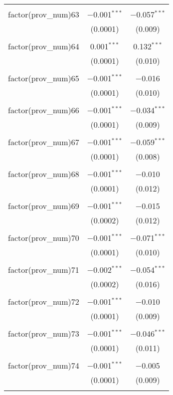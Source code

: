 \begin{table}[ht!]
\begin{tabular}{@{\extracolsep{5pt}}lcc}
  & & \\ 
 factor(prov\_num)63 & $-$0.001$^{***}$ & $-$0.057$^{***}$ \\ 
  & (0.0001) & (0.009) \\ 
  & & \\ 
 factor(prov\_num)64 & 0.001$^{***}$ & 0.132$^{***}$ \\ 
  & (0.0001) & (0.010) \\ 
  & & \\ 
 factor(prov\_num)65 & $-$0.001$^{***}$ & $-$0.016 \\ 
  & (0.0001) & (0.010) \\ 
  & & \\ 
 factor(prov\_num)66 & $-$0.001$^{***}$ & $-$0.034$^{***}$ \\ 
  & (0.0001) & (0.009) \\ 
  & & \\ 
 factor(prov\_num)67 & $-$0.001$^{***}$ & $-$0.059$^{***}$ \\ 
  & (0.0001) & (0.008) \\ 
  & & \\ 
 factor(prov\_num)68 & $-$0.001$^{***}$ & $-$0.010 \\ 
  & (0.0001) & (0.012) \\ 
  & & \\ 
 factor(prov\_num)69 & $-$0.001$^{***}$ & $-$0.015 \\ 
  & (0.0002) & (0.012) \\ 
  & & \\ 
 factor(prov\_num)70 & $-$0.001$^{***}$ & $-$0.071$^{***}$ \\ 
  & (0.0001) & (0.010) \\ 
  & & \\ 
 factor(prov\_num)71 & $-$0.002$^{***}$ & $-$0.054$^{***}$ \\ 
  & (0.0002) & (0.016) \\ 
  & & \\ 
 factor(prov\_num)72 & $-$0.001$^{***}$ & $-$0.010 \\ 
  & (0.0001) & (0.009) \\ 
  & & \\ 
 factor(prov\_num)73 & $-$0.001$^{***}$ & $-$0.046$^{***}$ \\ 
  & (0.0001) & (0.011) \\ 
  & & \\ 
 factor(prov\_num)74 & $-$0.001$^{***}$ & $-$0.005 \\ 
  & (0.0001) & (0.009) \\ 
  & & \\ 

\end{tabular}
\end{table}
